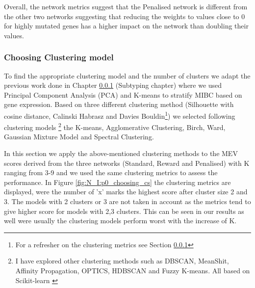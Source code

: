 Overall, the network metrics suggest that the Penalised network is different from the other two networks suggesting that reducing the weights to values close to 0 for highly mutated genes has a higher impact on the network than doubling their values.

\subsubsection{Choosing Clustering model}

To find the appropriate clustering model and the number of clusters we adapt the previous work done in Chapter \ref{} (Subtyping chapter) where we used Principal Component Analysis (PCA) and K-means to stratify MIBC based on gene expression. Based on three different clustering method (Silhouette with cosine distance, Calinski Habrasz and Davies Bouldin\footnote{For a refresher on the clustering metrics see Section \ref{}}) we selected following clustering models \footnote{I have explored other clustering methods such as DBSCAN, MeanShit, Affinity Propagation, OPTICS, HDBSCAN and Fuzzy K-means. All based on Scikit-learn \cite{Scikit-learn_undated-ax}} the K-means, Agglomerative Clustering, Birch, Ward, Gaussian Mixture Model and Spectral Clustering. 

In this section we apply the above-mentioned clustering methods to the MEV scores derived from the three networks (Standard, Reward and Penalised) with K ranging from 3-9 and we used the same clustering metrics to assess the performance. In Figure \ref{fig:N_I:p0_choosing_cs} the clustering metrics are displayed, were the number of 'x' marks the highest score after cluster size 2 and 3. The models with 2 clusters or 3 are not taken in account as the metrics tend to give higher score for models with 2,3  clusters. This can be seen in our results as well were usually the clustering models perform worst with the increase of K. 

    
